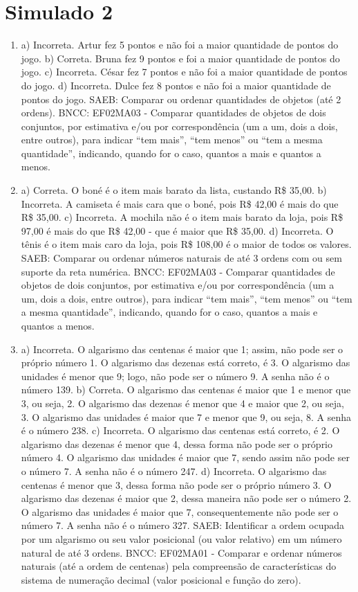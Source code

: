 \section*{Simulado 2}

\begin{enumerate}
\item
a) Incorreta. Artur fez 5 pontos e não foi a maior quantidade de pontos do jogo.
b) Correta. Bruna fez 9 pontos e foi a maior quantidade de pontos do jogo.
c) Incorreta. César fez 7 pontos e não foi a maior quantidade de pontos do jogo.
d) Incorreta. Dulce fez 8 pontos e não foi a maior quantidade de pontos do jogo.
SAEB: Comparar ou ordenar quantidades de objetos (até 2 ordens).
BNCC: EF02MA03 - Comparar quantidades de objetos de dois conjuntos, por
estimativa e/ou por correspondência (um a um, dois a dois, entre
outros), para indicar ``tem mais'', ``tem menos'' ou ``tem a mesma
quantidade'', indicando, quando for o caso, quantos a mais e quantos a
menos.

\item
a) Correta. O boné é o item mais barato da lista, custando R\$ 35,00.
b) Incorreta. A camiseta é mais cara que o boné, pois R\$ 42,00 é mais do que R\$ 35,00.
c) Incorreta. A mochila não é o item mais barato da loja, pois R\$ 97,00 é mais do que R\$ 42,00 - que é maior que R\$ 35,00.
d) Incorreta. O tênis é o item mais caro da loja, pois R\$ 108,00 é o maior de todos os valores.
SAEB: Comparar ou ordenar números naturais de até 3 ordens com
ou sem suporte da reta numérica.
BNCC: EF02MA03 - Comparar quantidades de objetos de dois conjuntos, por
estimativa e/ou por correspondência (um a um, dois a dois, entre
outros), para indicar ``tem mais'', ``tem menos'' ou ``tem a mesma
quantidade'', indicando, quando for o caso, quantos a mais e quantos a
menos.

\item
a) Incorreta. O algarismo das centenas é maior que 1; assim, não
pode ser o próprio número 1. O algarismo das dezenas está correto, é 3.
O algarismo das unidades é menor que 9; logo, não pode ser o número 9. A senha não é o número 139.
b) Correta. O algarismo das centenas é maior que 1 e menor que 3, ou
seja, 2. O algarismo das dezenas é menor que 4 e maior que 2, ou seja,
3. O algarismo das unidades é maior que 7 e menor que 9, ou seja, 8. A
senha é o número 238.
c) Incorreta. O algarismo das centenas está correto, é 2. O algarismo
das dezenas é menor que 4, dessa forma não pode ser o próprio número 4.
O algarismo das unidades é maior que 7, sendo assim não pode ser o
número 7. A senha não é o número 247.
d) Incorreta. O algarismo das centenas é menor que 3, dessa forma não
pode ser o próprio número 3. O algarismo das dezenas é maior que 2,
dessa maneira não pode ser o número 2. O algarismo das unidades é maior
que 7, consequentemente não pode ser o número 7. A senha não é o número
327.
SAEB: Identificar a ordem ocupada por um algarismo ou seu valor
posicional (ou valor relativo) em um número natural de até 3 ordens.
BNCC: EF02MA01 - Comparar e ordenar números naturais (até a ordem de
centenas) pela compreensão de características do sistema de numeração
decimal (valor posicional e função do zero).


\end{enumerate}
